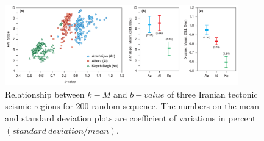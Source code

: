 

   
\begin{figure}%
	\centering
	\includegraphics[width=0.9\textwidth]{figures/pdf/figure-07} 
	\caption{Relationship between $k-M$ and $b-value$ of three Iranian tectonic seismic regions for 200 random sequence. The numbers on the mean and standard deviation plots are coefficient of variations in percent $(standard \ deviation / mean)$.}
	\label{fig:random}
\end{figure}


